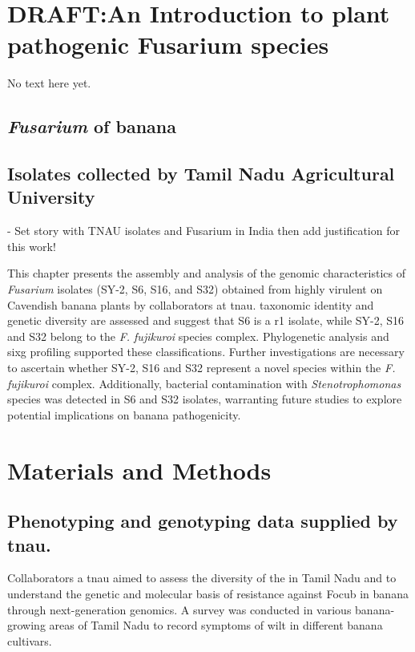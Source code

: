 
\section{\textbf{DRAFT:}An Introduction to plant pathogenic Fusarium species}
No text here yet. 



\subsection{\textit{Fusarium} of banana}
\subsection{Isolates collected by Tamil Nadu Agricultural University}

- Set story with TNAU isolates and Fusarium in India then add justification for this work!

This chapter presents the assembly and analysis of the genomic characteristics of \textit{Fusarium} isolates (SY-2, S6, S16, and S32) obtained from highly virulent on Cavendish banana plants by collaborators at \ac{tnau}. taxonomic identity and genetic diversity are assessed and suggest that S6 is a \Focub \ac{r1} isolate, while SY-2, S16 and S32 belong to the \textit{F. fujikuroi} species complex. Phylogenetic analysis and \ac{sixg} profiling supported these classifications. Further investigations are necessary to ascertain whether SY-2, S16 and S32 represent a novel species within the \textit{F. fujikuroi} complex. Additionally, bacterial contamination with \textit{Stenotrophomonas} species was detected in S6 and S32 isolates, warranting future studies to explore potential implications on banana pathogenicity.


\section{Materials and Methods}
\subsection{Phenotyping and genotyping data supplied by \ac{tnau}.}

Collaborators a \ac{tnau} aimed to assess the diversity of the \Focub in Tamil Nadu and to understand the genetic and molecular basis of resistance against \ac{Focub} in banana through next-generation genomics. A survey was conducted in various banana-growing areas of Tamil Nadu to record symptoms of wilt in different banana cultivars. 

